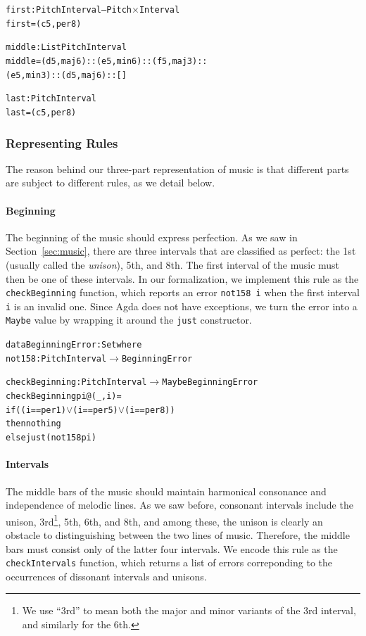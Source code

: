 \begin{alltt}  
first : PitchInterval -- Pitch \(\times\) Interval
first = (c 5 , per8)

middle : List PitchInterval
middle = (d 5 , maj6) :: (e 5 , min6) :: (f 5 , maj3) ::
         (e 5 , min3) :: (d 5 , maj6) :: []

last : PitchInterval
last = (c 5 , per8)
\end{alltt}

\subsubsection{Representing Rules}

The reason behind our three-part representation of music is that
different parts are subject to different rules, as we detail below.

\paragraph{Beginning}

The beginning of the music should express perfection.
As we saw in Section~\ref{sec:music}, there are three intervals that
are classified as perfect: the 1st (usually called the \emph{unison}),
5th, and 8th.
The first interval of the music must then be one of these intervals.
In our formalization, we implement this rule as the
\texttt{checkBeginning} function, which reports an error
\texttt{not158 i} when the first interval \texttt{i} is an invalid one.
Since Agda does not have exceptions, we turn the error into a
\texttt{Maybe} value by wrapping it around the \texttt{just} constructor.

\begin{alltt}
data BeginningError : Set where
  not158 : PitchInterval \(\rightarrow\) BeginningError
  
checkBeginning : PitchInterval \(\rightarrow\) Maybe BeginningError
checkBeginning pi@(_ , i) =
  if ((i == per1) \(\vee\) (i == per5) \(\vee\) (i == per8))
  then nothing
  else just (not158 pi)
\end{alltt}

\paragraph{Intervals}

The middle bars of the music should maintain harmonical consonance
and independence of melodic lines.
As we saw before, consonant intervals include the unison,
3rd\footnote{We use ``3rd'' to mean both the major and minor variants
of the 3rd interval, and similarly for the 6th.}, 5th, 6th, and 8th,
and among these, the unison is clearly an obstacle to distinguishing
between the two lines of music.
Therefore, the middle bars must consist only of the latter four intervals.
We encode this rule as the \texttt{checkIntervals} function, which
returns a list of errors correponding to the occurrences of dissonant
intervals and unisons.

